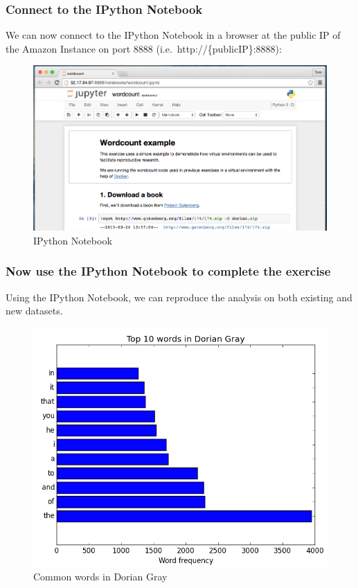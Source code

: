 \subsubsection{Connect to the IPython
Notebook}\label{connect-to-the-ipython-notebook}

We can now connect to the IPython Notebook in a browser at the public IP
of the Amazon Instance on port 8888 (i.e.~http://\{publicIP\}:8888):

\begin{figure}[htbp]
\centering
\includegraphics{96Cloud/figures/notebook.png}
\caption{IPython Notebook}
\end{figure}

\subsubsection{Now use the IPython Notebook to complete the
exercise}\label{now-use-the-ipython-notebook-to-complete-the-exercise}

Using the IPython Notebook, we can reproduce the analysis on both
existing and new datasets.

\begin{figure}[htbp]
\centering
\includegraphics{96Cloud/figures/dorian_wordcount.png}
\caption{Common words in Dorian Gray}
\end{figure}

